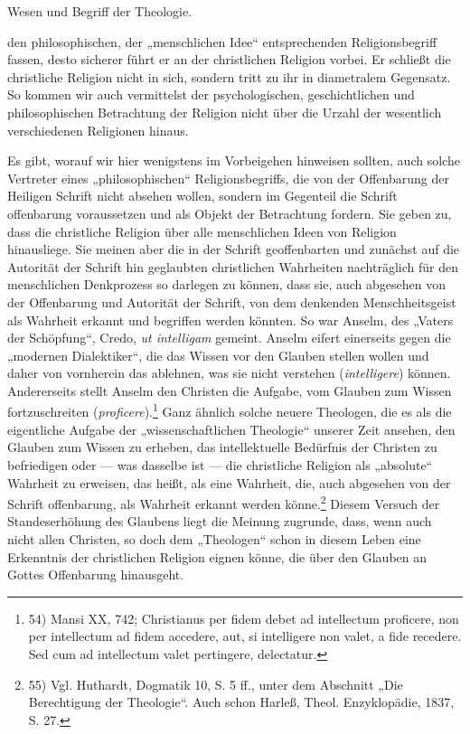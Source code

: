 \hfill Wesen und Begriff der Theologie.\par den philosophischen, der „menschlichen Idee“ entsprechenden Religionsbegriff fassen, desto sicherer führt er an der christlichen Religion vorbei. Er schließt die christliche Religion nicht in sich, sondern tritt zu ihr in diametralem Gegensatz. So kommen wir auch vermittelst der psychologischen, geschichtlichen und philosophischen Betrachtung der Religion nicht über die Urzahl der wesentlich verschiedenen Religionen hinaus.\par Es gibt, worauf wir hier wenigstens im Vorbeigehen hinweisen sollten, auch solche Vertreter eines „philosophischen“ Religionsbegriffs, die von der Offenbarung der Heiligen Schrift nicht absehen wollen, sondern im Gegenteil die Schrift offenbarung voraussetzen und als Objekt der Betrachtung fordern. Sie geben zu, dass die christliche Religion über alle menschlichen Ideen von Religion hinausliege. Sie meinen aber die in der Schrift geoffenbarten und zunächst auf die Autorität der Schrift hin geglaubten christlichen Wahrheiten nachträglich für den menschlichen Denkprozess so darlegen zu können, dass sie, auch abgesehen von der Offenbarung und Autorität der Schrift, von dem denkenden Menschheitsgeist als Wahrheit erkannt und begriffen werden könnten. So war Anselm, des „Vaters der Schöpfung“, Credo, \emph{ut intelligam} gemeint. Anselm eifert einerseits gegen die „modernen Dialektiker“, die das Wissen vor den Glauben stellen wollen und daher von vornherein das ablehnen, was sie nicht verstehen (\emph{intelligere}) können. Andererseits stellt Anselm den Christen die Aufgabe, vom Glauben zum Wissen fortzuschreiten (\emph{proficere}).\footnote{54) Mansi XX, 742; Christianus per fidem debet ad intellectum proficere, non per intellectum ad fidem accedere, aut, si intelligere non valet, a fide recedere. Sed cum ad intellectum valet pertingere, delectatur.} Ganz ähnlich solche neuere Theologen, die es als die eigentliche Aufgabe der „wissenschaftlichen Theologie“ unserer Zeit ansehen, den Glauben zum Wissen zu erheben, das intellektuelle Bedürfnis der Christen zu befriedigen oder — was dasselbe ist — die christliche Religion als „absolute“ Wahrheit zu erweisen, das heißt, als eine Wahrheit, die, auch abgesehen von der Schrift offenbarung, als Wahrheit erkannt werden könne.\footnote{55) Vgl. Huthardt, Dogmatik 10, S. 5 ff., unter dem Abschnitt „Die Berechtigung der Theologie“. Auch schon Harleß, Theol. Enzyklopädie, 1837, S. 27.} Diesem Versuch der Standeserhöhung des Glaubens liegt die Meinung zugrunde, dass, wenn auch nicht allen Christen, so doch dem „Theologen“ schon in diesem Leben eine Erkenntnis der christlichen Religion eignen könne, die über den Glauben an Gottes Offenbarung hinausgeht.